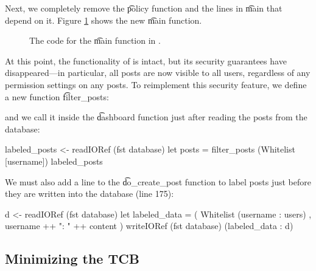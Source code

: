 \begin{refsection}
Next, we completely remove the \t{policy} function and the lines in \t{main} that depend on it.
%
Figure \ref{code_main_viN} shows the new \t{main} function.
\begin{figure}
\caption{The code for the \t{main} function in \viN{}.}
\label{code_main_viN}
\end{figure}
%
At this point, the functionality of \myapp{} is intact,
but its security guarantees have disappeared---in
particular, all posts are now visible to all users,
regardless of any permission settings on any posts.
%
To reimplement this security feature,
we define a new function \t{filter\_posts}:
and we call it inside the \t{dashboard} function just after reading the posts from the database:
\begin{fb}
labeled_posts <- readIORef (fst database)
let posts = filter_posts (Whitelist [username]) labeled_posts
\end{fb}
We must also add a line to the \t{do\_create\_post} function to label posts just before they are written into the database (line 175):
\begin{fb}
d <- readIORef (fst database)
let labeled_data = ( Whitelist (username : users) ,
                     username ++ ": " ++ content  )
writeIORef (fst database) (labeled_data : d)
\end{fb}

\subsection{Minimizing the TCB}


\end{refsection}
